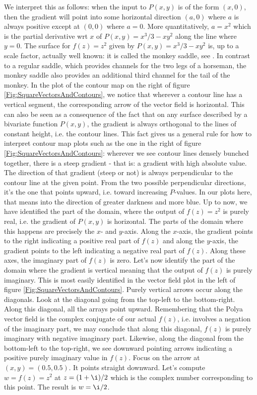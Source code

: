 \documentclass[12pt]{article}
\begin{document}
We interpret this as follows: when the input to $P(x,y)$ is of the form $(x,0)$, then the gradient will point into some horizontal direction $(a,0)$ where $a$ is always positive except at $(0,0)$ where $a=0$. More quantitatively, $a=x^2$ which is the partial derivative wrt $x$ of $P(x,y) = x^3/3 - x y^2$ along the line where $y=0$. The surface for $f(z) = z^2$ given by $P(x,y) = x^3/3 - x y^2$ is, up to a scale factor, actually well known: it is called the monkey saddle, see \cite{MonkeySaddleWiki}. In contrast to a regular saddle, which provides channels for the two legs of a horseman, the monkey saddle also provides an additional third channel for the tail of the monkey. In the plot of the contour map on the right of figure \ref{Fig:SquareVectorsAndContours}, we notice that wherever a contour line has a vertical segment, the corresponding arrow of the vector field is horizontal. This can also be seen as a consequence of the fact that on any surface described by a bivariate function $P(x,y)$, the gradient is always orthogonal to the lines of constant height, i.e. the contour lines. This fact gives us a general rule for how to interpret contour map plots such as the one in the right of figure \ref{Fig:SquareVectorsAndContours}: wherever we see contour lines densely bunched together, there is a steep gradient - that is: a gradient with high absolute value. The direction of that gradient (steep or not) is always perpendicular to the contour line at the given point. From the two possible perpendicular directions, it's the one that points upward, i.e. toward increasing $P$-values. In our plots here, that means into the direction of greater darkness and more blue. Up to now, we have identified the part of the domain, where the output of $f(z) = z^2$ is purely real, i.e. the gradient of $P(x,y)$ is horizontal. The parts of the domain where this happens are precisely the $x$- and $y$-axis. Along the $x$-axis, the gradient points to the right indicating a positive real part of $f(z)$ and along the $y$-axis, the gradient points to the left indicating a negative real part of $f(z)$. Along these axes, the imaginary part of $f(z)$ is zero. Let's now identify the part of the domain where the gradient is vertical meaning that the output of $f(z)$ is purely imaginary. This is most easily identified in the vector field plot in the left of figure \ref{Fig:SquareVectorsAndContours}. Purely vertical arrows occur along the diagonals. Look at the diagonal going from the top-left to the bottom-right. Along this diagonal, all the arrays point upward. Remembering that the Polya vector field is the complex conjugate of our actual $f(z)$, i.e. involves a negation of the imaginary part, we may conclude that along this diagonal, $f(z)$ is purely imaginary with negative imaginary part. Likewise, along the diagonal from the bottom-left to the top-right, we see downward pointing arrows indicating a positive purely imaginary value in $f(z)$. Focus on the arrow at $(x,y) = (0.5,0.5)$. It points straight downward. Let's compute $w = f(z) = z^2$ at $z = (1 + \i) / 2$ which is the complex number corresponding to this point. The result is $w = \i / 2$.
\end{document}
